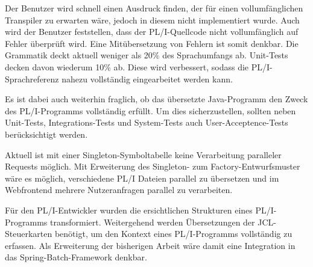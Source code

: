 Der Benutzer wird schnell einen Ausdruck finden, der für einen vollumfänglichen Transpiler zu erwarten wäre, jedoch in diesem nicht implementiert wurde.
Auch wird der Benutzer feststellen, dass der PL/I-Quellcode nicht vollumfänglich auf Fehler überprüft wird. Eine Mitübersetzung von Fehlern ist somit denkbar.
Die Grammatik deckt aktuell weniger als 20\% des Sprachumfangs ab. Unit-Tests decken davon wiederum 10\% ab.
Diese wird verbessert, sodass die PL/I-Sprachreferenz nahezu vollständig eingearbeitet werden kann.

Es ist dabei auch weiterhin fraglich, ob das übersetzte Java-Programm den Zweck des PL/I-Programms vollständig erfüllt. 
Um dies sicherzustellen, sollten neben Unit-Tests, Integrations-Tests und System-Tests auch User-Acceptence-Tests berücksichtigt werden.

Aktuell ist mit einer Singleton-Symboltabelle keine Verarbeitung paralleler Requests möglich. Mit Erweiterung des Singleton- zum Factory-Entwurfsmuster wäre es möglich, verschiedene PL/I Dateien parallel zu übersetzen und im Webfrontend mehrere Nutzeranfragen parallel zu verarbeiten. 

Für den PL/I-Entwickler wurden die ersichtlichen Strukturen eines PL/I-Programms transformiert. Weitergehend werden Übersetzungen der JCL-Steuerkarten benötigt, 
um den Kontext eines PL/I-Programms vollständig zu erfassen. Als Erweiterung der bisherigen Arbeit wäre damit eine Integration in das Spring-Batch-Framework denkbar.







